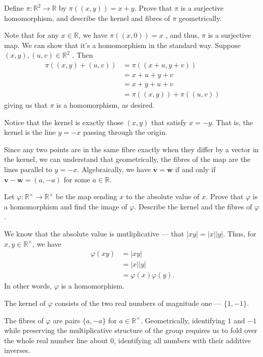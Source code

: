\documentclass[12 pt, letterpaper]{hmcpset}
\begin{document}
\begin{problem}
	Define $\pi : \mathbb{R}^{2} \to \mathbb{R}$ by $\pi((x, y)) = x + y$. Prove that $\pi$ is a surjective homomorphism, and describe the kernel and fibres of $\pi$ geometrically.
\end{problem}

\begin{solution}
	Note that for any $x \in \mathbb{R}$, we have $\pi((x, 0)) = x$ , and thus, $\pi$  is a surjective map. We can show that it's a homomorphism in the standard way. Suppose $(x, y), (u, v) \in \mathbb{R}^{2}$ . Then 
	\[
		\begin{split}
			\pi((x, y) + (u, v)) & = \pi((x + u, y + v)) \\
					     & = x + u + y + v \\
					     & = x + y + u + v \\
					     & = \pi((x, y)) + \pi((u, v))
		\end{split}
	\]
	giving us that $\pi$ is a homomorphism, as desired. 

	Notice that the kernel is exactly those $(x, y)$ that satisfy $x = - y$. That is, the kernel is the line $y = -x$ passing through the origin. 

	Since any two points are in the same fibre exactly when they differ by a vector in the kernel, we can understand that geometrically, the fibres of the map are the lines parallel to $y = -x$. Algebraically, we have $\overline{\mathbf{v}} = \overline{\mathbf{w}}$ if and only if $\mathbf{v} - \mathbf{w} = (a, -a)$ for some $a \in \mathbb{R}$.
\end{solution}

\pagebreak

\begin{problem}
	Let $\varphi : \mathbb{R}^{\times} \to \mathbb{R}^{\times}$ be the map sending $x$ to the absolute value of $x$. Prove that $\varphi$ is a homomorphism and find the image of $\varphi$. Describe the kernel and the fibres of $\varphi$.
\end{problem}

\begin{solution}
	We know that the absolute value is mutliplicative --- that $\lvert xy \rvert = \lvert x \rvert \lvert y \rvert$. Thus, for $x, y \in \mathbb{R}^{\times}$, we have
	\[
		\begin{split}
			\varphi(xy) & = \lvert xy \rvert \\
				    & = \lvert x \rvert \lvert y \rvert \\
				    & = \varphi(x) \varphi(y).
		\end{split}
	\]
	In other words, $\varphi$ is a homomorphism. 

	The kernel of $\varphi$ consists of the two real numbers of magnitude one --- $\{ 1, -1 \}$. 

	The fibres of $\varphi$ are pairs $\{ a, -a \}$ for $a \in \mathbb{R}^{\times}$. Geometrically, identifying $1$ and $-1$ while preserving the multiplicative structure of the group requires us to fold over the whole real number line about $0$, identifying all numbers with their additive inverses.
\end{solution}
\end{document}
